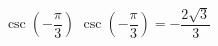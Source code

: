 {$\csc \left( -\dfrac{\pi}{3} \right)$}
{$\csc \left( -\dfrac{\pi}{3} \right) = -\dfrac{2\sqrt{3}}{3}$}
